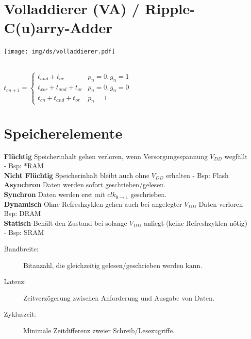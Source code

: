 \documentclass[6pt,a4paper]{scrartcl}
\renewcommand{\emph}[1]{\textsf{\textbf{#1}}}
\newcommand{\ra}[0]{\ensuremath{\rightarrow}} 									%
\begin{document}
\begin{multicols}{3}
\section{Volladdierer (VA) / Ripple-C(u)arry-Adder}
\parbox{5.0cm}{ \texttt{[image: img/ds/volladdierer.pdf]} }
\\
$t_{cn+1} = \begin{cases} t_{and} + t_{or} & p_n = 0, g_n=1 \\ t_{xor} + t_{and} + t_{or} & p_n = 0, g_n = 0 \\ t_{cn} + t_{and} + t_{or} & p_n = 1 \end{cases}$\\




\section{Speicherelemente}
	\emph{Flüchtig} Speicherinhalt gehen verloren, wenn Versorgungsspannung $V_{DD}$ wegfällt - Bsp: *RAM\\
	\emph{Nicht Flüchtig} Speicherinhalt bleibt auch ohne $V_{DD}$ erhalten - Bsp: Flash\\
	\emph{Asynchron} Daten werden sofort geschrieben/gelesen.\\
	\emph{Synchron} Daten werden erst mit $clk_{0 \ra 1}$ geschrieben.\\
	\emph{Dynamisch} Ohne Refreshzyklen gehen auch bei angelegter $V_{DD}$ Daten verloren -  Bsp: DRAM\\
	\emph{Statisch} Behält den Zustand bei solange $V_{DD}$ anliegt (keine Refreshzyklen nötig) - Bsp: SRAM\\
	\begin{description}
		\item[Bandbreite:] Bitanzahl, die gleichzeitig gelesen/geschrieben werden kann.
		\item[Latenz:] Zeitverzögerung zwischen Anforderung und Ausgabe von Daten.
		\item[Zykluszeit:] Minimale Zeitdifferenz zweier Schreib/Lesezugriffe.
	\end{description}
	

\end{multicols}
\end{document}
